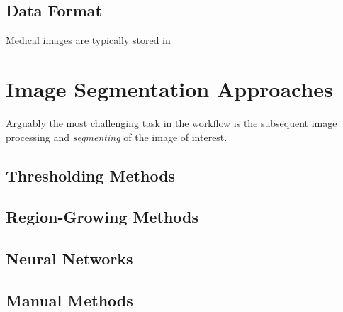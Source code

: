 \subsection{Data Format}
\label{Data Format-IMG}
Medical images are typically stored in 

\section{Image Segmentation Approaches}
\label{Image Segmentation Approaches}

Arguably the most challenging task in the workflow is the subsequent image processing and \textit{segmenting} of the image of interest.

\subsection{Thresholding Methods}
\label{Thresholding Methods}

\subsection{Region-Growing Methods}
\label{Region-Growing Methods}

\subsection{Neural Networks}
\label{Neural Networks}

\subsection{Manual Methods}
\label{Manual Methods}

